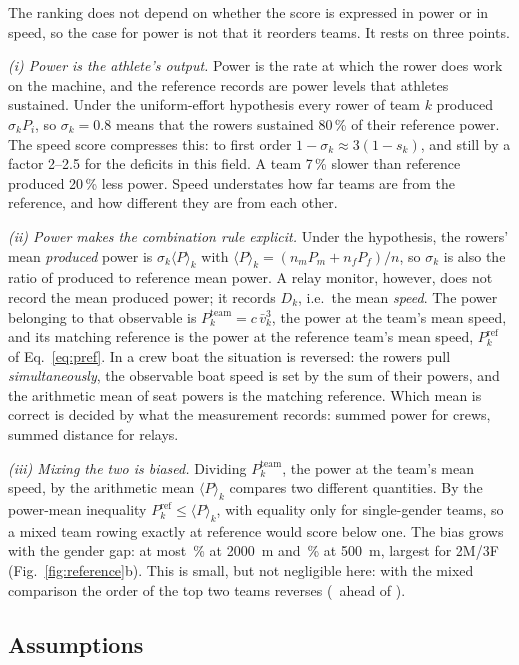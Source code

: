 \documentclass[twocolumn, 10pt]{article}
\newcommand{\Pref}{P^{\mathrm{ref}}}
\begin{document}
The ranking does not depend on whether the score is expressed in power or in
speed, so the case for power is not that it reorders teams.
It rests on three points.

\emph{(i) Power is the athlete's output.}
Power is the rate at which the rower does work on the machine, and the
reference records are power levels that athletes sustained.
Under the uniform-effort hypothesis every rower of team $k$ produced
$\sigma_kP_i$, so $\sigma_k=0.8$ means that the rowers sustained 80\,\% of
their reference power.
The speed score compresses this: to first order
$1-\sigma_k\approx3(1-s_k)$, and still by a factor 2--2.5 for the deficits in
this field.
A team 7\,\% slower than reference produced 20\,\% less power.
Speed understates how far teams are from the reference, and how different
they are from each other.

\emph{(ii) Power makes the combination rule explicit.}
Under the hypothesis, the rowers' mean \emph{produced} power is
$\sigma_k\langle P\rangle_k$ with $\langle P\rangle_k=(n_mP_m+n_fP_f)/n$, so
$\sigma_k$ is also the ratio of produced to reference mean power.
A relay monitor, however, does not record the mean produced power; it records
$D_k$, i.e.\ the mean \emph{speed}.
The power belonging to that observable is $P^{\mathrm{team}}_k=c\,\bar v_k^3$,
the power at the team's mean speed, and its matching reference is the power
at the reference team's mean speed, $\Pref_k$ of Eq.~\eqref{eq:pref}.
In a crew boat the situation is reversed: the rowers pull
\emph{simultaneously}, the observable boat speed is set by the sum of their
powers, and the arithmetic mean of seat powers is the matching reference.
Which mean is correct is decided by what the measurement records: summed
power for crews, summed distance for relays.

\emph{(iii) Mixing the two is biased.}
Dividing $P^{\mathrm{team}}_k$, the power at the team's mean speed, by the
arithmetic mean $\langle P\rangle_k$ compares two different quantities.
By the power-mean inequality $\Pref_k\le\langle P\rangle_k$, with equality only
for single-gender teams, so a mixed team rowing exactly at reference would
score below one.
The bias grows with the gender gap: at most \MaxBiasTwoK\,\% at
\SI{2000}{m} and \MaxBiasFive\,\% at \SI{500}{m}, largest for 2M/3F
(Fig.~\ref{fig:reference}b).
This is small, but not negligible here: with the mixed comparison the order of
the top two teams reverses (\OldFirst\ ahead of \OldSecond).

\subsection{Assumptions}
\end{document}
